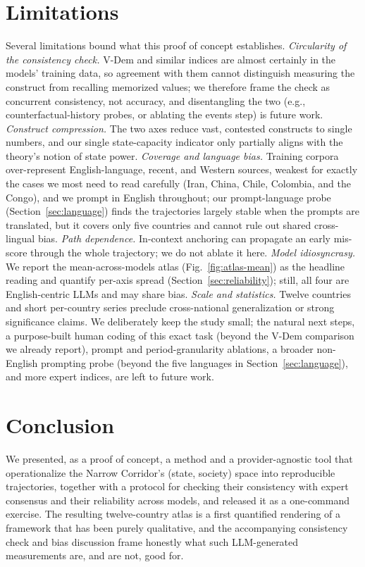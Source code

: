 \documentclass[twocolumn,10pt]{article}
\begin{document}
\section{Limitations}
\label{sec:limitations}
Several limitations bound what this proof of concept establishes.
\emph{Circularity of the consistency check.} V-Dem and similar indices are
almost certainly in the models' training data, so agreement with them cannot
distinguish measuring the construct from recalling memorized values; we therefore
frame the check as concurrent consistency, not accuracy, and disentangling the
two (e.g., counterfactual-history probes, or ablating the events step) is future
work. \emph{Construct compression.} The two axes reduce vast, contested
constructs to single numbers, and our single state-capacity indicator only
partially aligns with the theory's notion of state power. \emph{Coverage and
language bias.} Training corpora over-represent English-language, recent, and
Western sources, weakest for exactly the cases we most need to read carefully
(Iran, China, Chile, Colombia, and the Congo), and we prompt in English
throughout; our prompt-language probe (Section~\ref{sec:language}) finds the
trajectories largely stable when the prompts are translated, but it covers only
five countries and cannot rule out shared cross-lingual bias.
\emph{Path dependence.} In-context anchoring
can propagate an early mis-score through the whole trajectory; we do not ablate
it here. \emph{Model idiosyncrasy.} We report the mean-across-models atlas
(Fig.~\ref{fig:atlas-mean}) as the headline reading and quantify per-axis spread
(Section~\ref{sec:reliability}); still, all four are English-centric LLMs and may
share bias. \emph{Scale and statistics.} Twelve countries and short per-country
series preclude cross-national generalization or strong significance claims. We
deliberately keep the study small; the natural next steps, a purpose-built human
coding of this exact task (beyond the V-Dem comparison we already report),
prompt and period-granularity ablations, a broader non-English prompting probe
(beyond the five languages in Section~\ref{sec:language}), and more
expert indices, are left to future work.

\section{Conclusion}
We presented, as a proof of concept, a method and a provider-agnostic tool that
operationalize the Narrow Corridor's (state, society) space into reproducible
trajectories, together with a protocol for checking their consistency with
expert consensus and their reliability across models, and released it as a
one-command exercise. The resulting twelve-country atlas is a first
quantified rendering of a framework that has been purely qualitative, and the
accompanying consistency check and bias discussion frame honestly what such
LLM-generated measurements are, and are not, good for.
\end{document}
